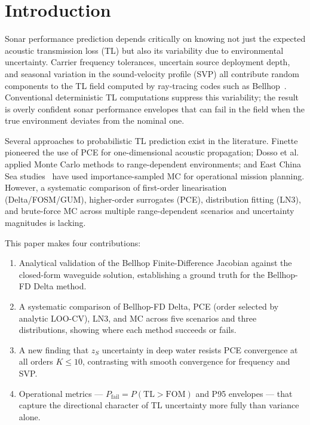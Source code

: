 \documentclass[journal,10pt,twoside]{IEEEtran}
\newcommand{\TL}{\mathrm{TL}}
\begin{document}
\section{Introduction}
\label{sec:intro}

Sonar performance prediction depends critically on knowing not just the
expected acoustic transmission loss (TL) but also its variability due to
environmental uncertainty.
Carrier frequency tolerances, uncertain source deployment depth, and seasonal
variation in the sound-velocity profile (SVP) all contribute random components
to the TL field computed by ray-tracing codes such as Bellhop~\cite{porter1987}.
Conventional deterministic TL computations suppress this variability; the result
is overly confident sonar performance envelopes that can fail in the field
when the true environment deviates from the nominal one.

Several approaches to probabilistic TL prediction exist in the literature.
Finette~\cite{finette2009} pioneered the use of PCE for one-dimensional
acoustic propagation; Dosso et al.~\cite{jmse2022} applied Monte Carlo methods
to range-dependent environments; and East China Sea studies~\cite{eastonchina2020}
have used importance-sampled MC for operational mission planning.
However, a systematic comparison of first-order linearisation (Delta/FOSM/GUM),
higher-order surrogates (PCE), distribution fitting (LN3), and brute-force MC
across multiple range-dependent scenarios and uncertainty magnitudes is lacking.

This paper makes four contributions:
\begin{enumerate}
  \item Analytical validation of the Bellhop Finite-Difference Jacobian against
        the closed-form waveguide solution, establishing a ground truth for the
        Bellhop-FD Delta method.
  \item A systematic comparison of Bellhop-FD Delta, PCE (order selected by
        analytic LOO-CV), LN3, and MC across five scenarios and three
        distributions, showing where each method succeeds or fails.
  \item A new finding that $z_S$ uncertainty in deep water resists PCE
        convergence at all orders $K \leq 10$, contrasting with smooth
        convergence for frequency and SVP.
  \item Operational metrics --- $P_\mathrm{fail} = P(\TL > \mathrm{FOM})$ and
        P95 envelopes --- that capture the directional character of TL
        uncertainty more fully than variance alone.
\end{enumerate}
\end{document}
